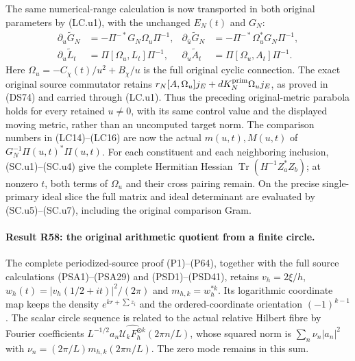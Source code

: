The same numerical-range calculation is now transported in
both original parameters by (LC.u1), with the unchanged
\(E_N(t)\) and \(G_N\):
\[
 \begin{aligned}
 \partial_u\widetilde G_N
   &=-\Pi^{-*}G_N\Omega_u\Pi^{-1},&
 \partial_{\bar u}\widetilde G_N
   &=-\Pi^{-*}\Omega_u^*G_N\Pi^{-1},\\
 \partial_u\widetilde L_t
   &=\Pi[\Omega_u,L_t]\Pi^{-1},&
 \partial_u\widetilde A_t
   &=\Pi[\Omega_u,A_t]\Pi^{-1}.
 \end{aligned}
\]
Here \(\Omega_u=-C_\chi(t)/u^2+B_\chi/u\) is the full
original cyclic connection.  The exact original source
commutator retains
\(r_N[A,\Omega_u]j_E+dK_N^{\rm prim}\Omega_u j_E\),
as proved in (DS74) and carried through (LC.u1).
Thus the preceding original-metric parabola holds for every
retained \(u\ne0\), with its same control value and the
displayed moving metric, rather than an uncomputed target
norm.
The comparison numbers in (LC14)--(LC16) are now the actual
\(m(u,t),M(u,t)\) of \(G_N^{-1}\Pi(u,t)^*\Pi(u,t)\).
For each constituent and each neighboring inclusion,
(SC.u1)--(SC.u4) give the complete Hermitian Hessian
\(\operatorname{Tr}(H^{-1}Z_a^*Z_b)\);
at nonzero \(t\), both terms of \(\Omega_u\) and their
cross pairing remain.  On the precise single-primary ideal
slice the full matrix and ideal determinant are evaluated
by (SC.u5)--(SC.u7), including the original comparison Gram.

\paragraph{Result R58: the original arithmetic quotient from a finite circle.}
The complete periodized-source proof (P1)--(P64), together with the
full source calculations (PSA1)--(PSA29) and (PSD1)--(PSD41), retains
$v_h=2\xi/h$, $w_h(t)=|v_h(1/2+it)|^2/(2\pi)$ and
$m_{h,k}=w_h^{*k}$. Its logarithmic coordinate map keeps the density
$e^{kr+\sum z_i}$ and the ordered-coordinate orientation
$(-1)^{k-1}$. The scalar circle sequence is related to the actual
relative Hilbert fibre by Fourier coefficients
$L^{-1/2}a_n\widehat{\mathcal U_kF_h^{\otimes k}}(2\pi n/L)$,
whose squared norm is $\sum_n\nu_n|a_n|^2$ with
$\nu_n=(2\pi/L)m_{h,k}(2\pi n/L)$. The zero mode remains in this sum.

